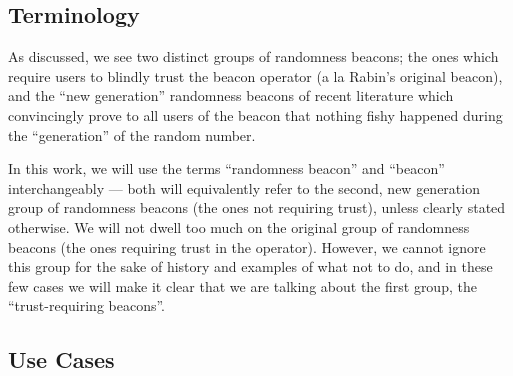 

\subsection{Terminology}
As discussed, we see two distinct groups of randomness beacons; the ones which require users to blindly trust the beacon operator (a la Rabin's original beacon), and the \enquote{new generation} randomness beacons of recent literature which convincingly prove to all users of the beacon that nothing fishy happened during the \enquote{generation} of the random number.

In this work, we will use the terms \enquote{randomness beacon} and \enquote{beacon} interchangeably --- both will equivalently refer to the second, new generation group of randomness beacons (the ones not requiring trust), unless clearly stated otherwise.
We will not dwell too much on the original group of randomness beacons (the ones requiring trust in the operator).
However, we cannot ignore this group for the sake of history and examples of what not to do, and in these few cases we will make it clear that we are talking about the first group, the \enquote{trust-requiring beacons}.

\subsection{Use Cases}






